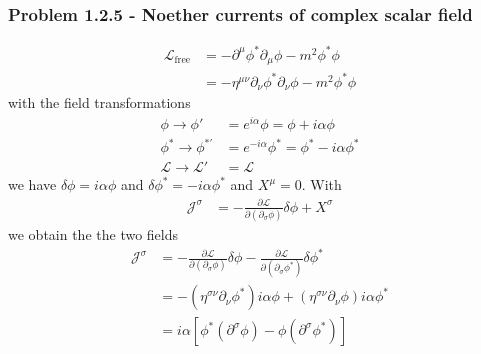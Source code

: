 \documentclass[10pt,a4paper]{article}
\theoremstyle{definition}
\begin{document}
\subsubsection*{Problem 1.2.5 - Noether currents of complex scalar field}
\begin{align}
    \mathcal{L}_\text{free}&=-\partial^\mu\phi^*\partial_\mu\phi-m^2\phi^*\phi\\
    &=-\eta^{\mu\nu}\partial_\nu\phi^*\partial_\nu\phi-m^2\phi^*\phi
\end{align}
with the field transformations
\begin{align}
    \phi\rightarrow\phi'&=e^{i\alpha}\phi=\phi+i\alpha\phi\\
    \phi^*\rightarrow\phi^{*'}&=e^{-i\alpha}\phi^*=\phi^*-i\alpha\phi^*\\
    \mathcal{L}\rightarrow\mathcal{L}'&=\mathcal{L}
\end{align}
we have $\delta\phi=i\alpha\phi$ and $\delta\phi^*=-i\alpha\phi^*$ and $X^\mu=0$. With 
\begin{align}
    \mathcal{J}^\sigma&=-\frac{\partial\mathcal{L}}{\partial(\partial_\sigma\phi)}\delta\phi+X^\sigma
\end{align}
we obtain the the two fields
\begin{align}    
    \mathcal{J}^\sigma&=-\frac{\partial\mathcal{L}}{\partial(\partial_\sigma\phi)}\delta\phi-\frac{\partial\mathcal{L}}{\partial(\partial_\sigma\phi^*)}\delta\phi^*\\
    &=-(\eta^{\sigma\nu}\partial_\nu\phi^*)i\alpha\phi+(\eta^{\sigma\nu}\partial_\nu\phi)i\alpha\phi^*\\
    &=i\alpha\left[\phi^*(\partial^\sigma\phi)-\phi(\partial^\sigma\phi^*)\right]
\end{align}
\end{document}
